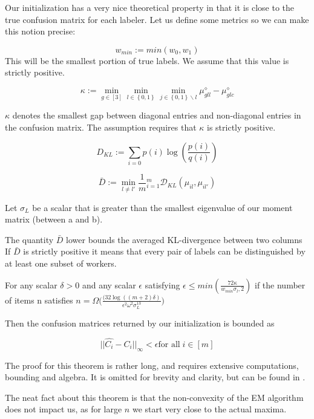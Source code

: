 Our initialization has a very nice theoretical property in that it is close to the true confusion matrix for each labeler. Let us define some metrics so we can make this notion precise:

$$ w_{min} := min(w_{0}, w_{1}) $$
This will be the smallest portion of true labels. We assume that this value is strictly positive.

$$ \kappa := \min_{g \in [3]} \min_{l \in \left\{0,1\right\}} \min_{j \in \left\{0,1\right\}\backslash l}  \mu^{\diamond}_{gll} - \mu^{\diamond}_{glc}$$

$\kappa$ denotes the smallest gap between diagonal entries and non-diagonal entries in the confusion matrix. The assumption requires that $\kappa$ is strictly positive.

$$D_{KL} := \displaystyle\sum\limits_{i=0} p(i)\log(\frac{p(i)}{q(i)}) $$

$$\bar{D} := \min_{l \neq l'} \frac{1}{m} \displaystyle_{i=1}^{m} \mathcal{D}_{KL}(\mu_{il},\mu_{il'})$$

Let $\sigma_{L}$ be a scalar that is greater than the smallest eigenvalue of our moment matrix (between a and b).

The quantity $\bar{D}$ lower bounds the averaged KL-divergence between two columns If $\bar{D}$ is strictly positive it means that every pair of labels can be distinguished by at least one subset of workers.


\begin{theorem}
For any scalar $\delta > 0$ and any scalar $\epsilon$ satisfying $\epsilon\leq min(\frac{72\kappa}{w_{min}\sigma_{l}, 2})$ if the number of
items n satisfies $ n = \Omega\Big ( \frac{(32\log((m + 2){\delta})}{\epsilon^{2}\omega^{2}\sigma_{L}^{13}} \Big ) $

Then the confusion matrices returned by our initialization is bounded as

$$ ||\hat{C_{i}} - C_{i}||_{\infty}  < \epsilon \text{for all} \; i \in  [m] $$

The proof for this theorem is rather long, and requires extensive computations,
bounding and algebra. It is omitted for brevity and clarity, but can be found
in \cite{zhang2014spectral}.
\end{theorem}

The neat fact about this theorem is that the non-convexity of the EM algorithm
does not impact us, as for large $n$ we start very close to the actual
maxima.
